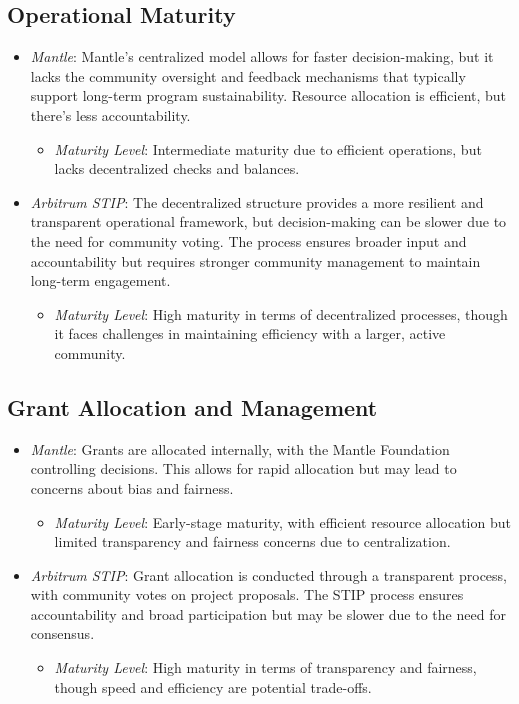 \documentclass[a4,10pt]{article}
\begin{document}
\subsection{Operational Maturity}\label{sec_15.5}
\begin{itemize}
    \item \textit{Mantle}: Mantle’s centralized model allows for faster decision-making, but it lacks the community oversight and feedback mechanisms that typically support long-term program sustainability. Resource allocation is efficient, but there's less accountability.
    \begin{itemize}
        \item \textit{Maturity Level}: Intermediate maturity due to efficient operations, but lacks decentralized checks and balances.
    \end{itemize}
    \item \textit{Arbitrum STIP}: The decentralized structure provides a more resilient and transparent operational framework, but decision-making can be slower due to the need for community voting. The process ensures broader input and accountability but requires stronger community management to maintain long-term engagement.
    \begin{itemize}
        \item \textit{Maturity Level}: High maturity in terms of decentralized processes, though it faces challenges in maintaining efficiency with a larger, active community.
    \end{itemize}
\end{itemize}

\subsection{Grant Allocation and Management}\label{sec_15.6}
\begin{itemize}
    \item \textit{Mantle}: Grants are allocated internally, with the Mantle Foundation controlling decisions. This allows for rapid allocation but may lead to concerns about bias and fairness.
    \begin{itemize}
        \item \textit{Maturity Level}: Early-stage maturity, with efficient resource allocation but limited transparency and fairness concerns due to centralization.
    \end{itemize}
    \item \textit{Arbitrum STIP}: Grant allocation is conducted through a transparent process, with community votes on project proposals. The STIP process ensures accountability and broad participation but may be slower due to the need for consensus.
    \begin{itemize}
        \item \textit{Maturity Level}: High maturity in terms of transparency and fairness, though speed and efficiency are potential trade-offs.
    \end{itemize}
\end{itemize}
\end{document}
